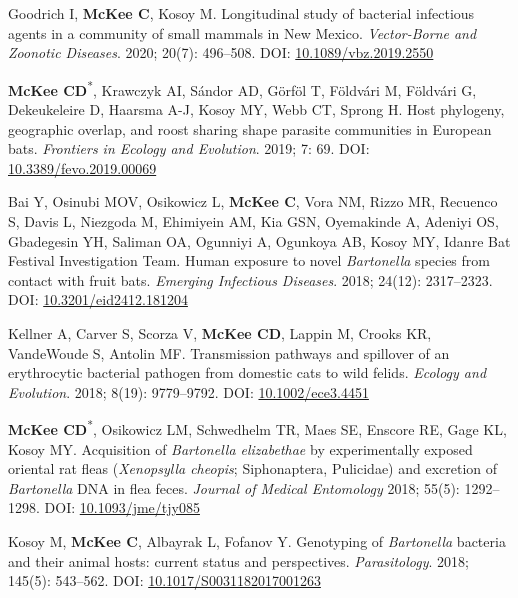 \documentclass{cv}
\begin{document}
\begin{pubenum}
\item Goodrich I, \textbf{McKee C}, Kosoy M. Longitudinal study of bacterial infectious agents in a community of small mammals in New Mexico. \textit{Vector-Borne and Zoonotic Diseases}. 2020; 20(7): 496--508. DOI: \href{https://doi.org/10.1089/vbz.2019.2550}{10.1089/vbz.2019.2550}

\item \textbf{McKee CD}\textsuperscript{*}, Krawczyk AI, Sándor AD, Görföl T, Földvári M, Földvári G, Dekeukeleire D, Haarsma A-J, Kosoy MY, Webb CT, Sprong H. Host phylogeny, geographic overlap, and roost sharing shape parasite communities in European bats. \textit{Frontiers in Ecology and Evolution}. 2019; 7: 69. DOI: \href{https://doi.org/10.3389/fevo.2019.00069}{10.3389/fevo.2019.00069}

\item Bai Y, Osinubi MOV, Osikowicz L, \textbf{McKee C}, Vora NM, Rizzo MR, Recuenco S, Davis L, Niezgoda M, Ehimiyein AM, Kia GSN, Oyemakinde A, Adeniyi OS, Gbadegesin YH, Saliman OA, Ogunniyi A, Ogunkoya AB, Kosoy MY, Idanre Bat Festival Investigation Team. Human exposure to novel \textit{Bartonella} species from contact with fruit bats. \textit{Emerging Infectious Diseases}. 2018; 24(12): 2317--2323. DOI: \href{https://doi.org/10.3201/eid2412.181204}{10.3201/eid2412.181204}

\item Kellner A, Carver S, Scorza V, \textbf{McKee CD}, Lappin M, Crooks KR, VandeWoude S, Antolin MF. Transmission pathways and spillover of an erythrocytic bacterial pathogen from domestic cats to wild felids. \textit{Ecology and Evolution}. 2018; 8(19): 9779--9792. DOI: \href{https://doi.org/10.1002/ece3.4451}{10.1002/ece3.4451}

\item \textbf{McKee CD}\textsuperscript{*}, Osikowicz LM, Schwedhelm TR, Maes SE, Enscore RE, Gage KL, Kosoy MY. Acquisition of \textit{Bartonella elizabethae} by experimentally exposed oriental rat fleas (\textit{Xenopsylla cheopis}; Siphonaptera, Pulicidae) and excretion of \textit{Bartonella} DNA in flea feces. \textit{Journal of Medical Entomology} 2018; 55(5): 1292--1298. DOI: \href{https://doi.org/10.1093/jme/tjy085}{10.1093/jme/tjy085}

\item Kosoy M\textsuperscript{\dag}, \textbf{McKee C}\textsuperscript{\dag}, Albayrak L, Fofanov Y. Genotyping of \textit{Bartonella} bacteria and their animal hosts: current status and perspectives. \textit{Parasitology}. 2018; 145(5): 543--562. DOI: \href{https://doi.org/10.1017/S0031182017001263}{10.1017/S0031182017001263}


\end{pubenum}
\end{document}
